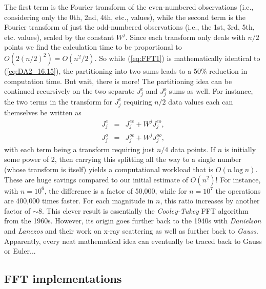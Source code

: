 The first term is the Fourier transform of the even-numbered observations (i.e., considering only the 0th, 2nd, 4th, etc., values), while the
second term is the Fourier transform of just the odd-numbered observations (i.e., the 1st, 3rd, 5th, etc. values), scaled by the constant $W^j$. Since
each transform only deals with $n/2$ points we find the calculation time to be proportional to $O(2(n/2)^2) = O(n^2/2)$.
So while (\ref{eq:FFT1}) is mathematically identical to (\ref{eq:DA2_16.15}), the partitioning into two sums leads to a 50\% reduction in computation time.
But wait, there is more! The partitioning idea can be continued recursively on the two separate $J_j^e$ and $J_j^o$
sums as well.  For instance, the two terms in the transform for $J_j^e$ requiring $n/2$ data values each can themselves be written as
\begin{equation}
\begin{array}{ccc}
	J_j^e & = & J_j^{ee} + W^j J_j^{eo}, \\[14pt]
	J_j^o & = & J_j^{oe} + W^j J_j^{oo},
\end{array}
\end{equation}
with each term being a transform requiring just $n/4$ data points.  If $n$ is initially some power of 2, then carrying this splitting
all the way to a single number (whose transform is itself) yields a computational workload that is $O(n \log n)$.
These are huge savings compared to our initial estimate of $O(n^2)$!  For instance, with $n = 10^6$, the difference is
a factor of 50,000, while for $n = 10^7$ the operations are 400,000 times faster.  For each magnitude in $n$, this ratio
increases by another factor of $\sim 8$.  This clever result is essentially the \emph{Cooley-Tukey}
 FFT algorithm from the 1960s.  However, its
origin goes further back to the 1940s with \emph{Danielson} and \emph{Lanczos} and their work
on x-ray scattering as well as further back to \emph{Gauss}.  Apparently, every neat mathematical idea can eventually
be traced back to Gauss or Euler...

\subsection{FFT implementations}


